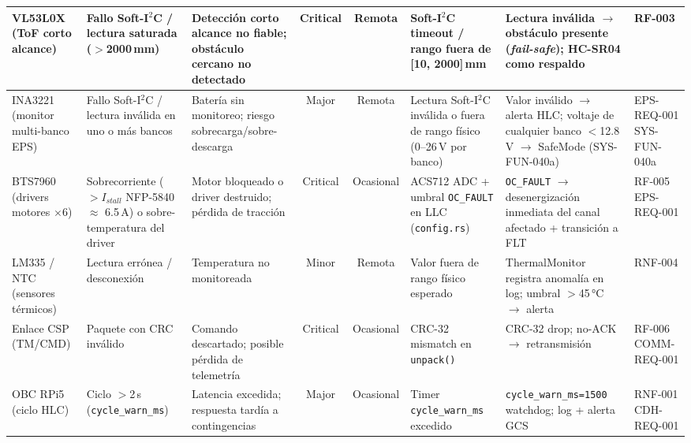 \begin{landscape}
\begin{longtable}{| l | p{2.4cm} | p{2.8cm} | c | c | p{2.6cm} | p{3.8cm} | l |}
VL53L0X \newline (ToF corto alcance) &
Fallo Soft-I$^2$C / lectura saturada ($>$2000\,mm) &
Detección corto alcance no fiable; obstáculo cercano no detectado &
Critical & Remota &
Soft-I$^2$C timeout / rango fuera de [10, 2000]\,mm &
Lectura inválida $\rightarrow$ obstáculo presente (\textit{fail-safe}); HC-SR04 como respaldo &
RF-003 \\ \hline

INA3221 \newline (monitor multi-banco EPS) &
Fallo Soft-I$^2$C / lectura inválida en uno o más bancos &
Batería sin monitoreo; riesgo sobrecarga/sobre-descarga &
Major & Remota &
Lectura Soft-I$^2$C inválida o fuera de rango físico (0--26\,V por banco) &
Valor inválido $\rightarrow$ alerta HLC; voltaje de cualquier banco $<$12.8\,V $\rightarrow$ SafeMode (SYS-FUN-040a) &
EPS-REQ-001 \newline SYS-FUN-040a \\ \hline

BTS7960 \newline (drivers motores $\times$6) &
Sobrecorriente ($>I_{stall}$ NFP-5840 $\approx$ 6.5\,A) o sobre-temperatura del driver &
Motor bloqueado o driver destruido; pérdida de tracción &
Critical & Ocasional &
ACS712 ADC + umbral \texttt{OC\_FAULT} en LLC (\texttt{config.rs}) &
\texttt{OC\_FAULT} $\rightarrow$ desenergización inmediata del canal afectado + transición a FLT &
RF-005 \newline EPS-REQ-001 \\ \hline

LM335 / NTC \newline (sensores térmicos) &
Lectura errónea / desconexión &
Temperatura no monitoreada &
Minor & Remota &
Valor fuera de rango físico esperado &
ThermalMonitor registra anomalía en log; umbral $>$45\,°C $\rightarrow$ alerta &
RNF-004 \\ \hline

Enlace CSP \newline (TM/CMD) &
Paquete con CRC inválido &
Comando descartado; posible pérdida de telemetría &
Critical & Ocasional &
CRC-32 mismatch en \texttt{unpack()} &
CRC-32 drop; no-ACK $\rightarrow$ retransmisión &
RF-006 \newline COMM-REQ-001 \\ \hline

OBC RPi5 \newline (ciclo HLC) &
Ciclo $>$2\,s (\texttt{cycle\_warn\_ms}) &
Latencia excedida; respuesta tardía a contingencias &
Major & Ocasional &
Timer \texttt{cycle\_warn\_ms} excedido &
\texttt{cycle\_warn\_ms=1500} watchdog; log + alerta GCS &
RNF-001 \newline CDH-REQ-001 \\ \hline


\end{longtable}
\end{landscape}
